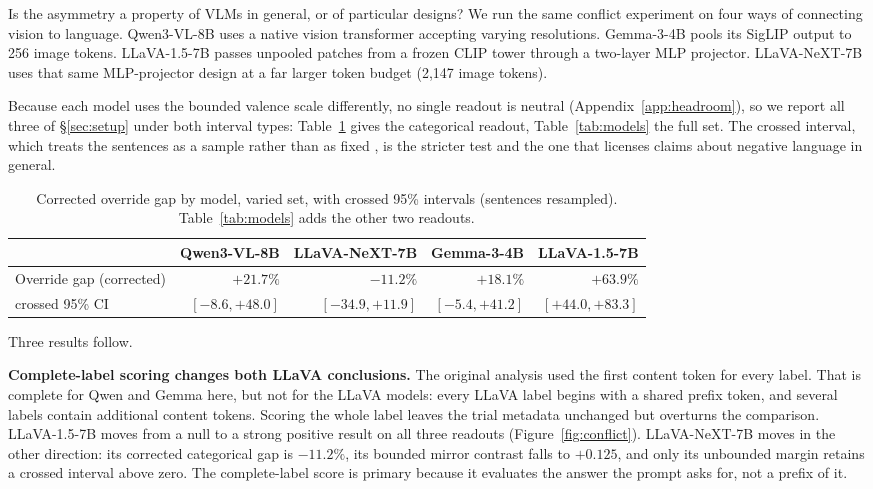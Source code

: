 \documentclass{article}
\newcommand{\gemma}{Gemma-3-4B}
\newcommand{\qwen}{Qwen3-VL-8B}
\newcommand{\llava}{LLaVA-1.5-7B}
\newcommand{\llavanext}{LLaVA-NeXT-7B}
\begin{document}
Is the asymmetry a property of VLMs in general, or of particular designs? We run the same conflict experiment on four ways of connecting vision to language. \qwen{} uses a native vision transformer accepting varying resolutions. \gemma{} pools its SigLIP \citep{siglip} output to 256 image tokens. \llava{} passes unpooled patches from a frozen CLIP \citep{clip} tower through a two-layer MLP projector. \llavanext{} uses that same MLP-projector design at a far larger token budget (2{,}147 image tokens).

Because each model uses the bounded valence scale differently, no single readout is neutral (Appendix~\ref{app:headroom}), so we report all three of \S\ref{sec:setup} under both interval types: Table~\ref{tab:gaps} gives the categorical readout, Table~\ref{tab:models} the full set. The crossed interval, which treats the sentences as a sample rather than as fixed \citep{clark1973, westfall2014}, is the stricter test and the one that licenses claims about negative language in general.

\begin{table}[h]
  \caption{Corrected override gap by model, varied set, with crossed 95\% intervals (sentences resampled). Table~\ref{tab:models} adds the other two readouts.}
  \label{tab:gaps}
  \centering
  \scriptsize
  \begin{tabular}{lrrrr}
    \toprule
    & \qwen{} & \llavanext{} & \gemma{} & \llava{} \\
    \midrule
    Override gap (corrected) & $+21.7\%$ & $-11.2\%$ & $+18.1\%$ & $+63.9\%$ \\
    \quad crossed 95\% CI & $[-8.6,+48.0]$ & $[-34.9,+11.9]$ & $[-5.4,+41.2]$ & $\mathbf{[+44.0,+83.3]}$ \\
    \bottomrule
  \end{tabular}
\end{table}

Three results follow.

\textbf{Complete-label scoring changes both LLaVA conclusions.} The original analysis used the first content token for every label. That is complete for Qwen and Gemma here, but not for the LLaVA models: every LLaVA label begins with a shared prefix token, and several labels contain additional content tokens. Scoring the whole label leaves the trial metadata unchanged but overturns the comparison. \llava{} moves from a null to a strong positive result on all three readouts (Figure~\ref{fig:conflict}). \llavanext{} moves in the other direction: its corrected categorical gap is $-11.2\%$, its bounded mirror contrast falls to $+0.125$, and only its unbounded margin retains a crossed interval above zero. The complete-label score is primary because it evaluates the answer the prompt asks for, not a prefix of it.
\end{document}
